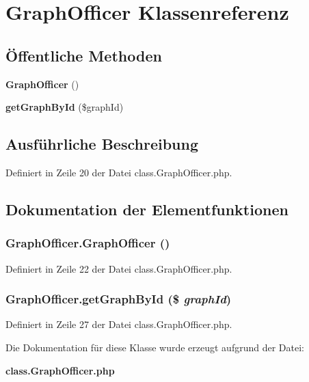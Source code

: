 \section{GraphOfficer Klassenreferenz}
\label{classGraphOfficer}
\subsection*{Öffentliche Methoden}
\begin{CompactItemize}
\item 
{\bf GraphOfficer} ()
\item 
{\bf getGraphById} (\$graphId)
\end{CompactItemize}


\subsection{Ausführliche Beschreibung}


Definiert in Zeile 20 der Datei class.GraphOfficer.php.

\subsection{Dokumentation der Elementfunktionen}
\subsubsection{\setlength{\rightskip}{0pt plus 5cm}GraphOfficer.GraphOfficer ()}\label{classGraphOfficer_bae90f1f491acdaf56aa08096028db7e}




Definiert in Zeile 22 der Datei class.GraphOfficer.php.
\subsubsection{\setlength{\rightskip}{0pt plus 5cm}GraphOfficer.getGraphById (\$ {\em graphId})}\label{classGraphOfficer_14bfc24f0d95656741ecff542a71a815}




Definiert in Zeile 27 der Datei class.GraphOfficer.php.

Die Dokumentation für diese Klasse wurde erzeugt aufgrund der Datei:\begin{CompactItemize}
\item 
{\bf class.GraphOfficer.php}\end{CompactItemize}
